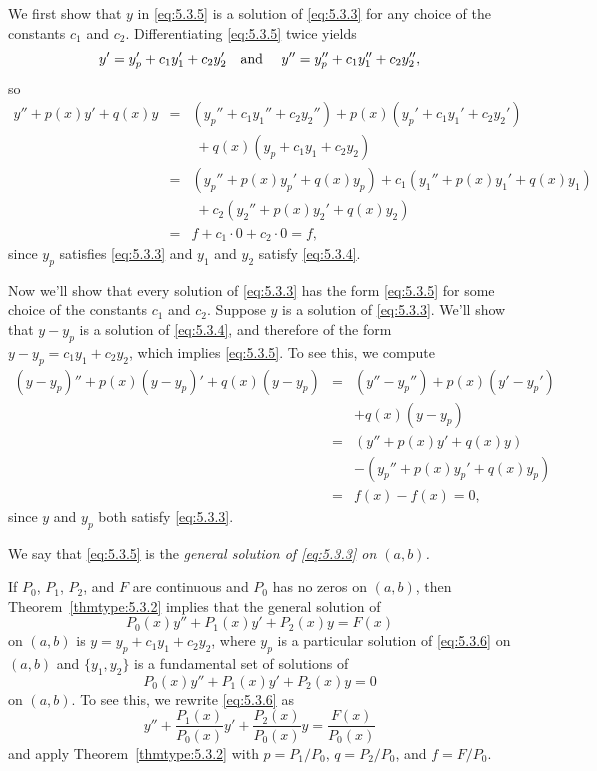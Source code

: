 \proof We first show that $y$ in \eqref{eq:5.3.5} is a solution of \eqref{eq:5.3.3} for any choice
of the constants $c_{1}$ and $c_{2}$. Differentiating \eqref{eq:5.3.5} twice yields
\[
  y'=y_{p}'+c_{1}y_{1}'+c_{2}y_{2}'\mbox{\quad and \quad}y''=y_{p}''+c_{1}y_{1}''+c_{2}y_{2}'',
\]
so
\begin{eqnarray*}
  y''+p(x)y'+q(x)y & = & (y_{p}''+c_{1}y_{1}''+c_{2}y_{2}'')+p(x)(y_{p}'+c_{1}y_{1}'+c_{2}y_{2}') \\
                   &   & \;+q(x)(y_{p}+c_{1}y_{1}+c_{2}y_{2})                                     \\
                   & = & (y_{p}''+p(x)y_{p}'+q(x)y_{p})+c_{1}(y_{1}''+p(x)y_{1}'+q(x)y_{1})       \\
                   &   & \;+c_{2}(y_{2}''+p(x)y_{2}'+q(x)y_{2})                                   \\
                   & = & f+c_{1}\cdot0+c_{2}\cdot0=f,
\end{eqnarray*}
since $y_{p}$ satisfies \eqref{eq:5.3.3} and $y_{1}$ and $y_{2}$ satisfy \eqref{eq:5.3.4}.

Now we'll show that every solution of \eqref{eq:5.3.3} has the form \eqref{eq:5.3.5} for some choice
of the constants $c_{1}$ and $c_{2}$. Suppose $y$ is a solution of \eqref{eq:5.3.3}. We'll show that
$y-y_{p}$ is a solution of \eqref{eq:5.3.4}, and therefore of the form
$y-y_{p}=c_{1}y_{1}+c_{2}y_{2}$, which implies \eqref{eq:5.3.5}. To see this, we compute
\begin{eqnarray*}
  (y-y_{p})''+p(x)(y-y_{p})'+q(x)(y-y_{p}) & = & (y''-y_{p}'')+p(x)(y'-y_{p}')   \\
                                           &   & +q(x)(y-y_{p})                  \\
                                           & = & (y''+p(x)y'+q(x)y)              \\
                                           &   & -(y_{p}''+p(x)y_{p}'+q(x)y_{p}) \\
                                           & = & f(x)-f(x)=0,
\end{eqnarray*}
since $y$ and $y_{p}$ both satisfy \eqref{eq:5.3.3}. \bbox

We say that \eqref{eq:5.3.5} is the {\color{blue}\it general solution of \eqref{eq:5.3.3} on
$(a,b)$.\/}

If $P_{0}$, $P_{1}$, $P_{2}$, and $F$ are continuous and $P_{0}$ has no zeros on $(a,b)$, then
Theorem~\ref{thmtype:5.3.2} implies that the general solution of
\begin{equation}
  \label{eq:5.3.6}P_{0}(x)y''+P_{1}(x)y'+P_{2}(x)y=F(x)
\end{equation}
on $(a,b)$ is $y=y_{p}+c_{1}y_{1}+c_{2}y_{2}$, where $y_{p}$ is a particular solution of
\eqref{eq:5.3.6} on $(a,b)$ and $\{y_{1},y_{2}\}$ is a fundamental set of solutions of
\[
  P_{0}(x)y''+P_{1}(x)y'+P_{2}(x)y=0
\]
on $(a,b)$. To see this, we rewrite \eqref{eq:5.3.6} as
\[
  y''+\frac{P_{1}(x)}{P_{0}(x)}y'+\frac{P_{2}(x)}{P_{0}(x)}y=\frac{F(x)}{P_{0}(x)}
\]
and apply Theorem~\ref{thmtype:5.3.2} with $p=P_{1}/P_{0}$, $q=P_{2}/P_{0}$, and $f=F/P_{0}$.

